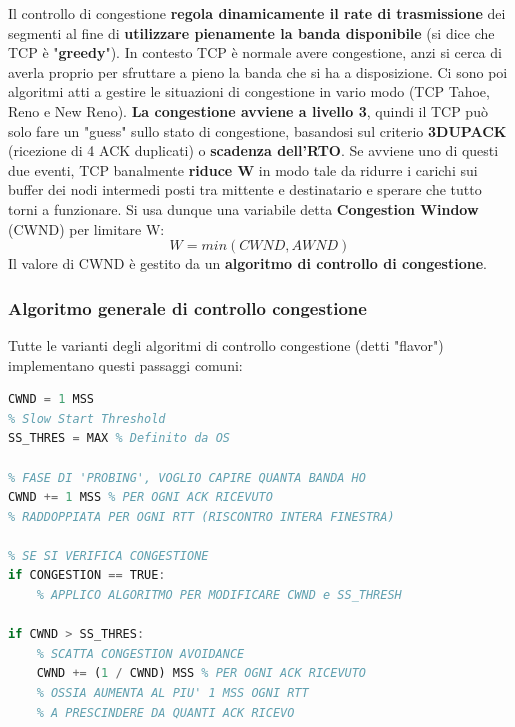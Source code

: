 \documentclass[12pt]{article}
\begin{document}
Il controllo di congestione \textbf{regola dinamicamente il rate di trasmissione} dei segmenti al fine di \textbf{utilizzare pienamente la banda disponibile} (si dice che TCP è "\textbf{greedy}"). In contesto TCP è normale avere congestione, anzi si cerca di averla proprio per sfruttare a pieno la banda che si ha a disposizione. Ci sono poi algoritmi atti a gestire le situazioni di congestione in vario modo (TCP Tahoe, Reno e New Reno). \textbf{La congestione avviene a livello 3}, quindi il TCP può solo fare un "guess" sullo stato di congestione, basandosi sul criterio \textbf{3DUPACK} (ricezione di 4 ACK duplicati) o \textbf{scadenza dell'RTO}. Se avviene uno di questi due eventi, TCP banalmente \textbf{riduce W} in modo tale da ridurre i carichi sui buffer dei nodi intermedi posti tra mittente e destinatario e sperare che tutto torni a funzionare. Si usa dunque una variabile detta \textbf{Congestion Window} (CWND) per limitare W:
\begin{equation*}
    W = min(CWND, AWND)
\end{equation*}
Il valore di CWND è gestito da un \textbf{algoritmo di controllo di congestione}.

\subsubsection{Algoritmo generale di controllo congestione}

Tutte le varianti degli algoritmi di controllo congestione (detti "flavor") implementano questi passaggi comuni:
\begin{lstlisting}[language=Octave]
% MSS = Maximum Segment Size, dim. massima del payload
CWND = 1 MSS
% Slow Start Threshold
SS_THRES = MAX % Definito da OS
    
% FASE DI 'PROBING', VOGLIO CAPIRE QUANTA BANDA HO
CWND += 1 MSS % PER OGNI ACK RICEVUTO
% RADDOPPIATA PER OGNI RTT (RISCONTRO INTERA FINESTRA)
    
% SE SI VERIFICA CONGESTIONE
if CONGESTION == TRUE:
    % APPLICO ALGORITMO PER MODIFICARE CWND e SS_THRESH
        
if CWND > SS_THRES:
    % SCATTA CONGESTION AVOIDANCE
    CWND += (1 / CWND) MSS % PER OGNI ACK RICEVUTO
    % OSSIA AUMENTA AL PIU' 1 MSS OGNI RTT
    % A PRESCINDERE DA QUANTI ACK RICEVO
\end{lstlisting}
\end{document}
